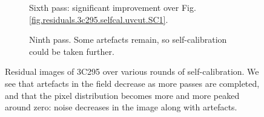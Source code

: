 \begin{figure}[t!]
\begin{subfigure}{.43\textwidth}
\end{subfigure}
\hfill
\begin{subfigure}{.43\textwidth}
\caption{\label{fig.residuals.3c295.selfcal.uvcut.SC6} Sixth pass: significant improvement over Fig. \ref{fig.residuals.3c295.selfcal.uvcut.SC1}.}
\end{subfigure}
\hfill
\begin{subfigure}{.43\textwidth}
\caption{\label{fig.residuals.3c295.selfcal.uvcut.SC9} Ninth pass. Some artefacts remain, so self-calibration could be taken further.}
\end{subfigure}
\caption{\label{fig.residuals.3c295.selfcal.uvcut} Residual images of 3C295 over various rounds of self-calibration. We see that artefacts in the field decrease as more passes are completed, and that the pixel distribution becomes more and more peaked around zero: noise decreases in the image along with artefacts.}

\end{figure}

